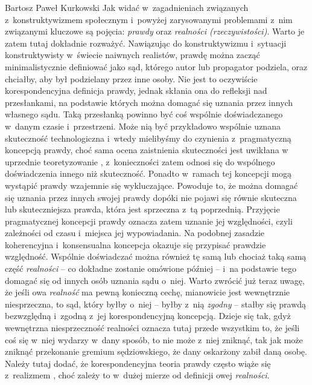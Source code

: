 \begin{artplenv}{Bartosz Paweł Kurkowski}
Jak widać w~zagadnieniach związanych z~konstruktywizmem społecznym i~powyżej zarysowanymi problemami z~nim związanymi
kluczowe są pojęcia: \textit{prawdy }oraz\textit{ realności (rzeczywistości)}. Warto je zatem tutaj dokładnie rozważyć.
Nawiązując do konstruktywizmu i~sytuacji konstruktywisty w~świecie naiwnych realistów, prawdę można zacząć
minimalistycznie definiować jako sąd, którego autor lub propagator podziela, oraz chciałby, aby był podzielany przez
inne osoby. Nie jest to oczywiście korespondencyjna definicja prawdy, jednak skłania ona do refleksji nad przesłankami,
na podstawie których można domagać się uznania przez innych własnego sądu. Taką przesłanką powinno być coś wspólnie
doświadczanego w~danym czasie i~przestrzeni. Może nią być przykładowo wspólnie uznana skuteczność
technologiczna i~wtedy mielibyśmy do czynienia z~pragmatyczną koncepcją prawdy,
choć sama ocena zaistnienia skuteczności jest uwikłana w
uprzednie teoretyzowanie
\parencite[s.~264]{grobler_metodologia_2006},
z~konieczności zatem odnosi się do wspólnego
doświadczenia innego niż skuteczność. Ponadto w~ramach tej koncepcji mogą wystąpić prawdy wzajemnie się wykluczające.
Powoduje to, że można domagać się uznania przez innych swojej prawdy dopóki nie pojawi się równie skuteczna lub
skuteczniejsza prawda, która jest sprzeczna z~tą poprzednią. Przyjęcie pragmatycznej koncepcji prawdy oznacza zatem
uznanie jej względności, czyli zależności od czasu i~miejsca jej wypowiadania. Na podobnej zasadzie koherencyjna
i~konsensualna koncepcja okazuje się przypisać prawdzie względność. Wspólnie doświadczać można również tę samą lub
chociaż taką samą część \textit{realności} -- co dokładne zostanie omówione później -- i~na podstawie tego domagać się od
innych osób uznania sądu o~niej. Warto zwrócić już teraz uwagę, że jeśli owa \textit{realność} ma pewną konieczną
cechę, mianowicie jest wewnętrznie niesprzeczna, to sąd, który byłby o~niej -- byłby z~nią \textit{zgodny} -- stałby się
prawdą bezwzględną i~zgodną z~jej korespondencyjną koncepcją. Dzieje się tak, gdyż wewnętrzna niesprzeczność realności
oznacza tutaj przede wszystkim to, że jeśli coś się w~niej wydarzy w~dany sposób, to nie może z~niej zniknąć, tak jak
może zniknąć przekonanie gremium sędziowskiego, że dany oskarżony zabił daną osobę. Należy tutaj dodać, że
korespondencyjna teoria prawdy często wiąże się z~realizmem
\parencite[s.~391]{gorazda_filozofia_2014},
choć
zależy to w~dużej mierze od definicji owej \textit{realności}.


\end{artplenv}
